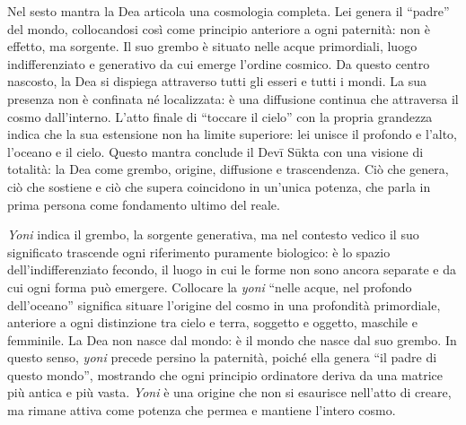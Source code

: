 Nel sesto mantra la Dea articola una cosmologia completa. Lei genera il “padre” del mondo, collocandosi così come principio anteriore a ogni paternità: non è effetto, ma sorgente. Il suo grembo è situato nelle acque primordiali, luogo indifferenziato e generativo da cui emerge l’ordine cosmico. Da questo centro nascosto, la Dea si dispiega attraverso tutti gli esseri e tutti i mondi. La sua presenza non è confinata né localizzata: è una diffusione continua che attraversa il cosmo dall’interno. L’atto finale di “toccare il cielo” con la propria grandezza indica che la sua estensione non ha limite superiore: lei unisce il profondo e l’alto, l’oceano e il cielo. Questo mantra conclude il Devī Sūkta con una visione di totalità: la Dea come grembo, origine, diffusione e trascendenza. Ciò che genera, ciò che sostiene e ciò che supera coincidono in un’unica potenza, che parla in prima persona come fondamento ultimo del reale.

\textit{Yoni} indica il grembo, la sorgente generativa, ma nel contesto vedico il suo significato trascende ogni riferimento puramente biologico: è lo spazio dell’indifferenziato fecondo, il luogo in cui le forme non sono ancora separate e da cui ogni forma può emergere. Collocare la \textit{yoni} “nelle acque, nel profondo dell’oceano” significa situare l’origine del cosmo in una profondità primordiale, anteriore a ogni distinzione tra cielo e terra, soggetto e oggetto, maschile e femminile. La Dea non nasce dal mondo: è il mondo che nasce dal suo grembo. In questo senso, \textit{yoni} precede persino la paternità, poiché ella genera “il padre di questo mondo”, mostrando che ogni principio ordinatore deriva da una matrice più antica e più vasta. \textit{Yoni} è una origine che non si esaurisce nell’atto di creare, ma rimane attiva come potenza che permea e mantiene l’intero cosmo.



